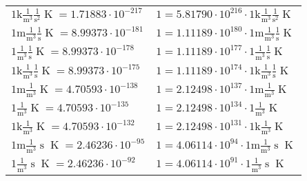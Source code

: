 \begin{center}
\begin{longtable}{l l}
{\color{gray}$1 \bm{\mathrm{ k}}\frac1{\operatorname{m}^3}\frac1{\operatorname{s}^2}{}{\operatorname{K}} = 1.71883\cdot10^{-217} $}   & {\color{gray}$ 1 = 5.81790\cdot10^{216} \cdot 1 \bm{\mathrm{ k}}\frac1{\operatorname{m}^3}\frac1{\operatorname{s}^2}{}{\operatorname{K}}$}  \\
{\color{gray}$1 \bm{\mathrm{ m}}\frac1{\operatorname{m}^3}\frac1{\operatorname{s}}{}{\operatorname{K}} = 8.99373\cdot10^{-181} $}   & {\color{gray}$ 1 = 1.11189\cdot10^{180} \cdot 1 \bm{\mathrm{ m}}\frac1{\operatorname{m}^3}\frac1{\operatorname{s}}{}{\operatorname{K}}$}  \\
{\color{black}$1 \bm{\mathrm{ }}\frac1{\operatorname{m}^3}\frac1{\operatorname{s}}{}{\operatorname{K}} = 8.99373\cdot10^{-178} $}   & {\color{black}$ 1 = 1.11189\cdot10^{177} \cdot 1 \bm{\mathrm{ }}\frac1{\operatorname{m}^3}\frac1{\operatorname{s}}{}{\operatorname{K}}$}  \\
{\color{gray}$1 \bm{\mathrm{ k}}\frac1{\operatorname{m}^3}\frac1{\operatorname{s}}{}{\operatorname{K}} = 8.99373\cdot10^{-175} $}   & {\color{gray}$ 1 = 1.11189\cdot10^{174} \cdot 1 \bm{\mathrm{ k}}\frac1{\operatorname{m}^3}\frac1{\operatorname{s}}{}{\operatorname{K}}$}  \\
{\color{gray}$1 \bm{\mathrm{ m}}\frac1{\operatorname{m}^3}{}{}{\operatorname{K}} = 4.70593\cdot10^{-138} $}   & {\color{gray}$ 1 = 2.12498\cdot10^{137} \cdot 1 \bm{\mathrm{ m}}\frac1{\operatorname{m}^3}{}{}{\operatorname{K}}$}  \\
{\color{black}$1 \bm{\mathrm{ }}\frac1{\operatorname{m}^3}{}{}{\operatorname{K}} = 4.70593\cdot10^{-135} $}   & {\color{black}$ 1 = 2.12498\cdot10^{134} \cdot 1 \bm{\mathrm{ }}\frac1{\operatorname{m}^3}{}{}{\operatorname{K}}$}  \\
{\color{gray}$1 \bm{\mathrm{ k}}\frac1{\operatorname{m}^3}{}{}{\operatorname{K}} = 4.70593\cdot10^{-132} $}   & {\color{gray}$ 1 = 2.12498\cdot10^{131} \cdot 1 \bm{\mathrm{ k}}\frac1{\operatorname{m}^3}{}{}{\operatorname{K}}$}  \\
{\color{gray}$1 \bm{\mathrm{ m}}\frac1{\operatorname{m}^3}{\operatorname{s}}{}{\operatorname{K}} = 2.46236\cdot10^{-95} $}   & {\color{gray}$ 1 = 4.06114\cdot10^{94} \cdot 1 \bm{\mathrm{ m}}\frac1{\operatorname{m}^3}{\operatorname{s}}{}{\operatorname{K}}$}  \\
{\color{black}$1 \bm{\mathrm{ }}\frac1{\operatorname{m}^3}{\operatorname{s}}{}{\operatorname{K}} = 2.46236\cdot10^{-92} $}   & {\color{black}$ 1 = 4.06114\cdot10^{91} \cdot 1 \bm{\mathrm{ }}\frac1{\operatorname{m}^3}{\operatorname{s}}{}{\operatorname{K}}$}  \\

\end{longtable}
\end{center}
